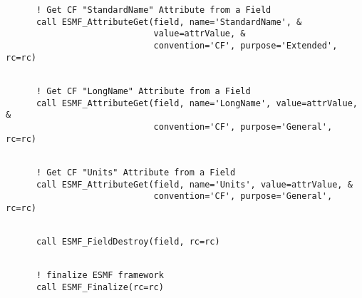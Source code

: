  \begin{verbatim}
      ! Get CF "StandardName" Attribute from a Field
      call ESMF_AttributeGet(field, name='StandardName', &
                             value=attrValue, &
                             convention='CF', purpose='Extended', rc=rc)
 
\end{verbatim}
 

 \begin{verbatim}
      ! Get CF "LongName" Attribute from a Field
      call ESMF_AttributeGet(field, name='LongName', value=attrValue, &
                             convention='CF', purpose='General', rc=rc)
 
\end{verbatim}
 

 \begin{verbatim}
      ! Get CF "Units" Attribute from a Field
      call ESMF_AttributeGet(field, name='Units', value=attrValue, &
                             convention='CF', purpose='General', rc=rc)
 
\end{verbatim}
 

 \begin{verbatim}
      call ESMF_FieldDestroy(field, rc=rc)
 
\end{verbatim}
 

 \begin{verbatim}
      ! finalize ESMF framework
      call ESMF_Finalize(rc=rc)
 
\end{verbatim}

\setlength{\parskip}{\oldparskip}
\setlength{\parindent}{\oldparindent}
\setlength{\baselineskip}{\oldbaselineskip}
